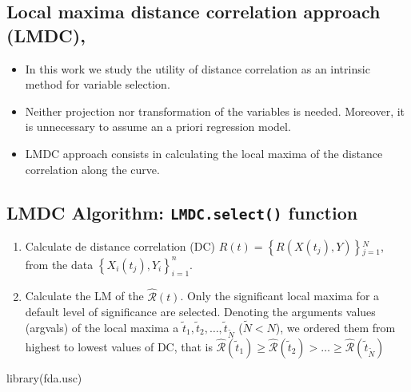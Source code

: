 \documentclass[
]{book}
\newenvironment{Shaded}{\begin{snugshade}}{\end{snugshade}}
\newcommand{\FunctionTok}[1]{\textcolor[rgb]{0.00,0.00,0.00}{#1}}
\newcommand{\NormalTok}[1]{#1}
\begin{document}
\hypertarget{local-maxima-distance-correlation-approach-lmdc-ordonez2018}{%
\subsection{\texorpdfstring{Local maxima distance correlation approach (LMDC), \citep{Ordonez2018}}{Local maxima distance correlation approach (LMDC), {[}@Ordonez2018{]}}}\label{local-maxima-distance-correlation-approach-lmdc-ordonez2018}}

\begin{itemize}
\item
  In this work we study the utility of distance correlation \citet{Szekely2007} as an intrinsic method for variable selection.
\item
  Neither projection nor transformation of the variables is needed. Moreover, it is unnecessary to assume an a priori regression model.
\item
  LMDC approach consists in calculating the local maxima of the distance correlation along the curve.
\end{itemize}

\hypertarget{lmdc-algorithm-lmdc.select-function}{%
\subsection{\texorpdfstring{LMDC Algorithm: \texttt{LMDC.select()} function}{LMDC Algorithm: LMDC.select() function}}\label{lmdc-algorithm-lmdc.select-function}}

\begin{enumerate}
\def\labelenumi{\arabic{enumi}.}
\item
  Calculate de distance correlation (DC) \(R(t) = \left \lbrace R(X(t_j),Y) \right\rbrace {_{j=1}^N}\), from the data \(\left \lbrace X_i (t_j),Y_i \right\rbrace _{i=1}^n\).
\item
  Calculate the LM of the \(\hat{\mathcal{R}} (t)\).
  Only the significant local maxima for a default level of significance are selected.
  Denoting the arguments values (argvals) of the local maxima a \(\tilde t_1,\tilde t_2,\ldots,\tilde t_{\tilde{N}}\) (\(\tilde{N}<N\)), we ordered them from highest to lowest values of DC, that is \(\hat{\mathcal{R}}(\tilde t_1) \geq \hat{ \mathcal{R}}(\tilde t_2) >\ldots \geq \hat {\mathcal{R}}(\tilde t_{\tilde{N}})\)
\end{enumerate}

\begin{Shaded}
\begin{Highlighting}[]
\FunctionTok{library}\NormalTok{(fda.usc)}
\end{Highlighting}
\end{Shaded}
\end{document}
